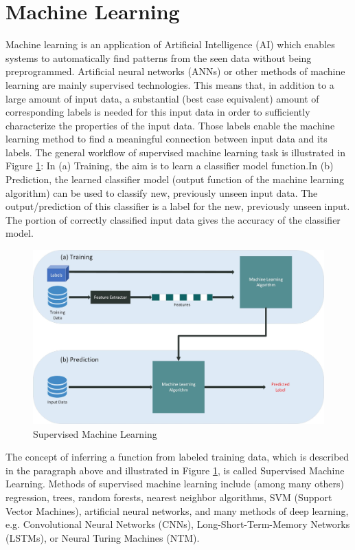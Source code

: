 \section{Machine Learning} 
\label{sec:ML}

Machine learning is an application of Artificial  Intelligence  (AI)  which enables systems to automatically find patterns from the seen data without being preprogrammed.  Artificial neural networks (ANNs) or other methods of machine learning are mainly supervised technologies.  This means that, in addition to a large amount of input data, a substantial (best case equivalent) amount of corresponding labels is needed for this input data in order to sufficiently characterize the properties of the input data.  Those labels enable the machine learning method to find a meaningful connection between input data and its labels.  The general workflow of supervised machine learning task is illustrated in Figure \ref{fig:svml}: In (a) Training, the aim is to learn a classifier model function.In (b) Prediction,  the learned classifier model (output function of the machine learning algorithm)  can be used to classify new, previously unseen input data. The output/prediction of this classifier is a label for the new, previously unseen input. The portion of correctly classified input data gives the accuracy of the classifier model.\\
\begin{figure}[h]
	\centering
  \includegraphics[width=\linewidth]{figures/ml_workflow}
  \caption{Supervised Machine Learning}
  \label{fig:svml}
\end{figure}

The concept of inferring a function from labeled training data,  which is described in the paragraph above and illustrated in Figure  \ref{fig:svml}, is called Supervised Machine Learning.  Methods of supervised machine learning include (among many others) regression, trees, random forests, nearest neighbor algorithms,  SVM (Support  Vector Machines), artificial neural networks, and many methods of deep learning, e.g. Convolutional  Neural Networks (CNNs), Long-Short-Term-Memory Networks (LSTMs),  or Neural Turing  Machines (NTM).\\

